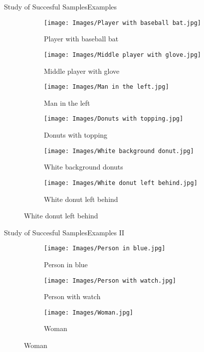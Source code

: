 \documentclass{beamer}
\begin{document}
\begin{frame}{Study of Succesful Samples}{Examples}
  \vspace*{-.75cm}
  \begin{figure}
    \centering
    \begin{subfigure}[t]{.32\textwidth}
      \centering
      \caption{Player with baseball bat}
      \texttt{[image: Images/Player with baseball bat.jpg]}
    \end{subfigure}\hfill
    \begin{subfigure}[t]{.32\textwidth}
      \centering
      \caption{Middle player with glove}
      \texttt{[image: Images/Middle player with glove.jpg]}
    \end{subfigure}\hfill
    \begin{subfigure}[t]{.32\textwidth}
      \centering
      \caption{Man in the left}
      \texttt{[image: Images/Man in the left.jpg]}
    \end{subfigure}

    \smallskip
    \begin{subfigure}[t]{.32\textwidth}
      \centering
      \caption{Donuts with topping}
      \texttt{[image: Images/Donuts with topping.jpg]}
    \end{subfigure}\hfill
    \begin{subfigure}[t]{.32\textwidth}
      \centering
      \caption{White background donuts}
      \texttt{[image: Images/White background donut.jpg]}
    \end{subfigure}\hfill
    \begin{subfigure}[t]{.32\textwidth}
      \centering
      \caption{White donut left behind}
      \texttt{[image: Images/White donut left behind.jpg]}
    \end{subfigure}
  \end{figure}
\end{frame}

\begin{frame}{Study of Succesful Samples}{Examples II}
  \vspace*{-.75cm}
  \begin{figure}
    \centering
    \begin{subfigure}[t]{.3\textwidth}
      \centering
      \caption{Person in blue}
      \texttt{[image: Images/Person in blue.jpg]}
    \end{subfigure}\hfill
    \begin{subfigure}[t]{.3\textwidth}
      \centering
      \caption{Person with watch}
      \texttt{[image: Images/Person with watch.jpg]}
    \end{subfigure}\hfill
    \begin{subfigure}[t]{.3\textwidth}
      \centering
      \caption{Woman}
      \texttt{[image: Images/Woman.jpg]}
    \end{subfigure}
  \end{figure}
\end{frame}
\end{document}
